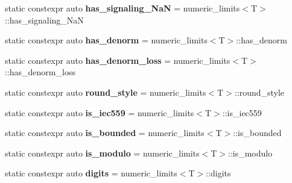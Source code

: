 \begin{DoxyCompactItemize}
static constexpr auto {\bfseries has\+\_\+signaling\+\_\+\+NaN} = numeric\+\_\+limits$<$T$>$\+::has\+\_\+signaling\+\_\+\+NaN
\item 
\mbox{\label{classstd_1_1numeric__limits_3_01dice_1_1safe_3_01T_01_4_01_4_aeb43cfd8d14912d6269cb508a876bc61}} 
static constexpr auto {\bfseries has\+\_\+denorm} = numeric\+\_\+limits$<$T$>$\+::has\+\_\+denorm
\item 
\mbox{\label{classstd_1_1numeric__limits_3_01dice_1_1safe_3_01T_01_4_01_4_a58b032007c89e09ea5778377f19d94e8}} 
static constexpr auto {\bfseries has\+\_\+denorm\+\_\+loss} = numeric\+\_\+limits$<$T$>$\+::has\+\_\+denorm\+\_\+loss
\item 
\mbox{\label{classstd_1_1numeric__limits_3_01dice_1_1safe_3_01T_01_4_01_4_a5c22fdc463f0b8b9718106a7ac8f29c4}} 
static constexpr auto {\bfseries round\+\_\+style} = numeric\+\_\+limits$<$T$>$\+::round\+\_\+style
\item 
\mbox{\label{classstd_1_1numeric__limits_3_01dice_1_1safe_3_01T_01_4_01_4_a4a23ba13b179a61b8d74c20117454040}} 
static constexpr auto {\bfseries is\+\_\+iec559} = numeric\+\_\+limits$<$T$>$\+::is\+\_\+iec559
\item 
\mbox{\label{classstd_1_1numeric__limits_3_01dice_1_1safe_3_01T_01_4_01_4_a3604a7c398f6ec782380fedb43209930}} 
static constexpr auto {\bfseries is\+\_\+bounded} = numeric\+\_\+limits$<$T$>$\+::is\+\_\+bounded
\item 
\mbox{\label{classstd_1_1numeric__limits_3_01dice_1_1safe_3_01T_01_4_01_4_aef120043edfd12361252b03ac4c7a458}} 
static constexpr auto {\bfseries is\+\_\+modulo} = numeric\+\_\+limits$<$T$>$\+::is\+\_\+modulo
\item 
\mbox{\label{classstd_1_1numeric__limits_3_01dice_1_1safe_3_01T_01_4_01_4_a7d62b138650e6cafaffd6a6413f69eae}} 
static constexpr auto {\bfseries digits} = numeric\+\_\+limits$<$T$>$\+::digits

\end{DoxyCompactItemize}
